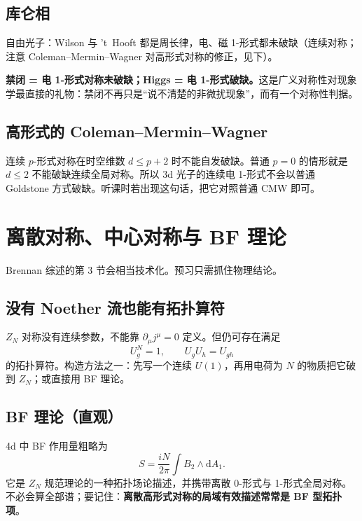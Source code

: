 \documentclass[11pt,a4paper]{article}
\theoremstyle{definition}
\theoremstyle{plain}
\theoremstyle{remark}
\newcommand{\dd}{\mathrm{d}}
\begin{document}
\subsection{库仑相}

自由光子：Wilson 与 't~Hooft 都是周长律，电、磁 1-形式都未破缺（连续对称；注意 Coleman--Mermin--Wagner 对高形式对称的修正，见下）。

\begin{keybox}
\textbf{禁闭 = 电 1-形式对称未破缺；Higgs = 电 1-形式破缺。}这是广义对称性对现象学最直接的礼物：禁闭不再只是``说不清楚的非微扰现象''，而有一个对称性判据。
\end{keybox}

\subsection{高形式的 Coleman--Mermin--Wagner}

连续 $p$-形式对称在时空维数 $d\le p+2$ 时不能自发破缺。普通 $p=0$ 的情形就是 $d\le 2$ 不能破缺连续全局对称。所以 3d 光子的连续电 1-形式不会以普通 Goldstone 方式破缺。听课时若出现这句话，把它对照普通 CMW 即可。

\section{离散对称、中心对称与 BF 理论}
\label{sec:discrete}

Brennan 综述的第 3 节会相当技术化。预习只需抓住物理结论。

\subsection{没有 Noether 流也能有拓扑算符}

$Z_N$ 对称没有连续参数，不能靠 $\partial_\mu j^\mu=0$ 定义。但仍可存在满足
\begin{equation}
  U_g^N=1,\qquad U_g U_h=U_{gh}
\end{equation}
的拓扑算符。构造方法之一：先写一个连续 $U(1)$，再用电荷为 $N$ 的物质把它破到 $Z_N$；或直接用 BF 理论。

\subsection{BF 理论（直观）}

4d 中 BF 作用量粗略为
\begin{equation}
  S=\frac{iN}{2\pi}\int B_2\wedge \dd A_1.
\end{equation}
它是 $Z_N$ 规范理论的一种拓扑场论描述，并携带离散 0-形式与 1-形式全局对称。不必会算全部谱；要记住：\textbf{离散高形式对称的局域有效描述常常是 BF 型拓扑项}。
\end{document}
